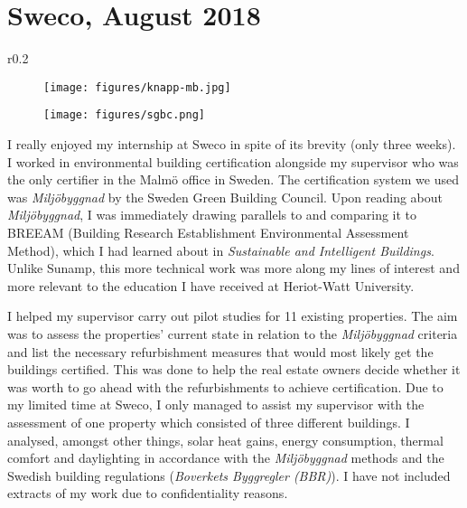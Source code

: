 
\newpage
\section{Sweco, August 2018}


\begin{wrapfigure}{r}{0.2\textwidth}
	\centering
	\begin{subfigure}{0.2\textwidth}
		\centering
		\texttt{[image: figures/knapp-mb.jpg]}
	\end{subfigure}
	\begin{subfigure}{0.2\textwidth}
		\centering
		\texttt{[image: figures/sgbc.png]}
	\end{subfigure}
	\label{fig:mb}
\end{wrapfigure}


I really enjoyed my internship at Sweco in spite of its brevity (only three weeks).
I worked in environmental building certification alongside my supervisor who was the only certifier in the Malm\"o office in Sweden.
The certification system we used was \textit{Milj\"obyggnad} by the Sweden Green Building Council.
Upon reading about \textit{Milj\"obyggnad}, I was immediately drawing parallels to and comparing it to BREEAM (Building Research Establishment Environmental Assessment Method), which I had learned about in \textit{Sustainable and Intelligent Buildings}.
Unlike Sunamp, this more technical work was more along my lines of interest and more relevant to the education I have received at Heriot-Watt University.

I helped my supervisor carry out pilot studies for 11 existing properties.
The aim was to assess the properties' current state in relation to the \textit{Milj\"obyggnad} criteria and list the necessary refurbishment measures that would most likely get the buildings certified.
This was done to help the real estate owners decide whether it was worth to go ahead with the refurbishments to achieve certification.
Due to my limited time at Sweco, I only managed to assist my supervisor with the assessment of one property which consisted of three different buildings.
I analysed, amongst other things, solar heat gains, energy consumption, thermal comfort and daylighting in accordance with the \textit{Milj\"obyggnad} methods and the Swedish building regulations (\textit{Boverkets Byggregler (BBR)}).
I have not included extracts of my work due to confidentiality reasons.

